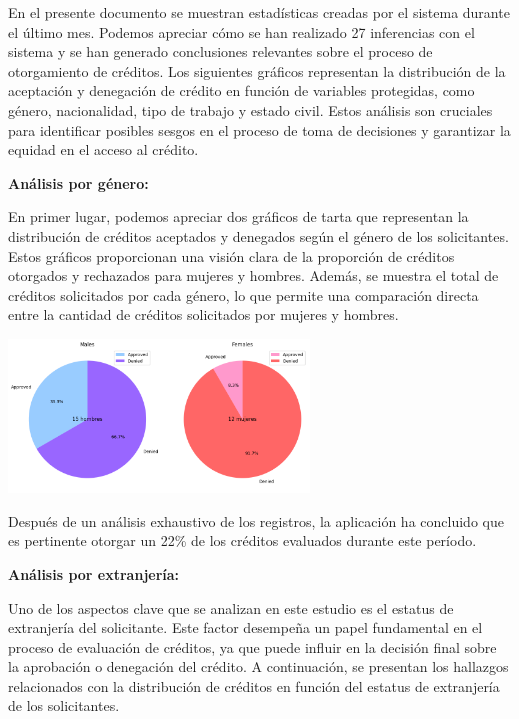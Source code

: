 \documentclass{article}
\begin{document}
\begin{multicols}{2}

En el presente documento se muestran estadísticas creadas por el sistema durante el último mes. Podemos apreciar cómo se han realizado {\huge 27 inferencias} con el sistema y se han generado conclusiones relevantes sobre el proceso de otorgamiento de créditos. Los siguientes gráficos representan la distribución de la aceptación y denegación de crédito en función de variables protegidas, como género, nacionalidad, tipo de trabajo y estado civil. Estos análisis son cruciales para identificar posibles sesgos en el proceso de toma de decisiones y garantizar la equidad en el acceso al crédito.

\vspace{0.5cm}
\textbf{Análisis por género:}

En primer lugar, podemos apreciar dos gráficos de tarta que representan la distribución de créditos aceptados y denegados según el género de los solicitantes. Estos gráficos proporcionan una visión clara de la proporción de créditos otorgados y rechazados para mujeres y hombres. Además, se muestra el total de créditos solicitados por cada género, lo que permite una comparación directa entre la cantidad de créditos solicitados por mujeres y hombres.

\begin{center} %
    \includegraphics[width=8cm]{tex/media/gender.png} 
\end{center}

Después de un análisis exhaustivo de los registros, la aplicación ha concluido que es pertinente {\huge otorgar un 22\%} de los créditos evaluados durante este período.

\vspace{0.5cm}
\textbf{Análisis por extranjería:}

Uno de los aspectos clave que se analizan en este estudio es el estatus de extranjería del solicitante. Este factor desempeña un papel fundamental en el proceso de evaluación de créditos, ya que puede influir en la decisión final sobre la aprobación o denegación del crédito. A continuación, se presentan los hallazgos relacionados con la distribución de créditos en función del estatus de extranjería de los solicitantes.



\end{multicols}
\end{document}
